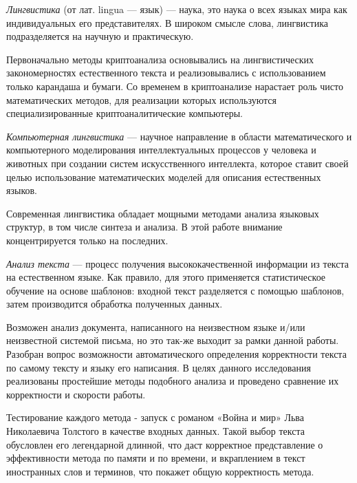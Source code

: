 \DEF\textit{Лингвистика} (от лат. lingua — язык) — наука, это наука о 
всех языках мира как индивидуальных его представителях. В широком смысле 
слова, лингвистика подразделяется на научную и практическую.

Первоначально методы криптоанализа основывались на лингвистических закономерностях 
естественного текста и реализовывались с использованием только карандаша 
и бумаги. Со временем в криптоанализе нарастает роль чисто математических 
методов, для реализации которых используются специализированные криптоаналитические 
компьютеры.

\DEF\textit{Компьютерная лингвистика} — научное направление в области математического 
и компьютерного моделирования интеллектуальных процессов у человека и животных 
при создании систем искусственного интеллекта, которое ставит своей целью 
использование математических моделей для описания естественных языков.

Современная лингвистика обладает мощными методами анализа языковых структур, 
в том числе синтеза и анализа. В этой работе внимание концентрируется только на 
последних.

\DEF\textit{Анализ текста} — процесс получения высококачественной информации из текста 
на естественном языке. Как правило, для этого применяется статистическое 
обучение на основе шаблонов: входной текст разделяется с помощью шаблонов,
затем производится обработка полученных данных.

Возможен анализ документа, написанного на неизвестном языке и/или неизвестной 
системой письма, но это так-же выходит за рамки данной работы. Разобран вопрос 
возможности автоматического определения корректности текста по самому 
тексту и языку его написания. В целях данного исследования реализованы простейшие
методы подобного анализа и проведено сравнение их корректности и скорости работы.

Тестирование каждого метода - запуск с романом «Война и мир» Льва Николаевича 
Толстого в качестве входных данных. Такой выбор текста обусловлен его 
легендарной длинной, что даст корректное представление о эффективности 
метода по памяти и по времени, и вкраплением в текст иностранных слов 
и терминов, что покажет общую корректность метода.

